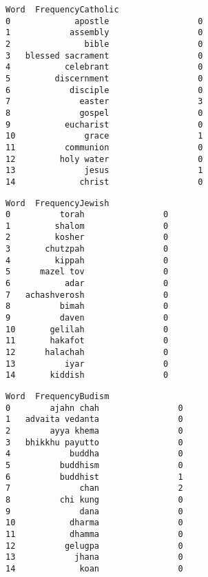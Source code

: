 \documentclass[11pt]{article}
\begin{document}
            \begin{tcolorbox}[breakable, size=fbox, boxrule=.5pt, pad at break*=1mm, opacityfill=0]
\begin{Verbatim}[commandchars=\\\{\}]
                 Word  FrequencyCatholic
0             apostle                  0
1            assembly                  0
2               bible                  0
3   blessed sacrament                  0
4           celebrant                  0
5         discernment                  0
6            disciple                  0
7              easter                  3
8              gospel                  0
9           eucharist                  0
10              grace                  1
11          communion                  0
12         holy water                  0
13              jesus                  1
14             christ                  0
\end{Verbatim}
\end{tcolorbox}
        
            \begin{tcolorbox}[breakable, size=fbox, boxrule=.5pt, pad at break*=1mm, opacityfill=0]
\begin{Verbatim}[commandchars=\\\{\}]
            Word  FrequencyJewish
0          torah                0
1         shalom                0
2         kosher                0
3       chutzpah                0
4         kippah                0
5      mazel tov                0
6           adar                0
7   achashverosh                0
8          bimah                0
9          daven                0
10       gelilah                0
11       hakafot                0
12      halachah                0
13          iyar                0
14       kiddish                0
\end{Verbatim}
\end{tcolorbox}
        
            \begin{tcolorbox}[breakable, size=fbox, boxrule=.5pt, pad at break*=1mm, opacityfill=0]
\begin{Verbatim}[commandchars=\\\{\}]
               Word  FrequencyBudism
0        ajahn chah                0
1   advaita vedanta                0
2        ayya khema                0
3   bhikkhu payutto                0
4            buddha                0
5          buddhism                0
6          buddhist                1
7              chan                2
8          chi kung                0
9              dana                0
10           dharma                0
11           dhamma                0
12          gelugpa                0
13            jhana                0
14             koan                0
\end{Verbatim}
\end{tcolorbox}
        
\end{document}
